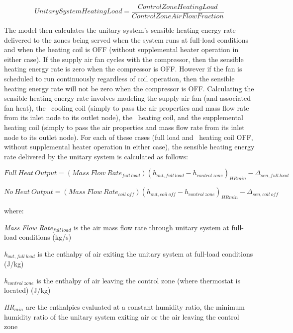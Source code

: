 \begin{equation}
UnitarySystemHeatingLoad = \frac{{ControlZoneHeatingLoad}}{{ControlZoneAirFlowFraction}}
\label{eq:UnitarySystemHeatingLoad}
\end{equation}

The model then calculates the unitary system's sensible heating energy rate delivered to the zones being served when the system runs at full-load conditions and when the heating coil is OFF (without supplemental heater operation in either case). If the supply air fan cycles with the compressor, then the sensible heating energy rate is zero when the compressor is OFF. However if the fan is scheduled to run continuously regardless of coil operation, then the sensible heating energy rate will not be zero when the compressor is OFF. Calculating the sensible heating energy rate involves modeling the supply air fan (and associated fan heat), the~ cooling coil (simply to pass the air properties and mass flow rate from its inlet node to its outlet node), the~ heating coil, and the supplemental heating coil (simply to pass the air properties and mass flow rate from its inlet node to its outlet node). For each of these cases (full load and~ heating coil OFF, without supplemental heater operation in either case), the sensible heating energy rate delivered by the unitary system is calculated as follows:

\begin{equation}
Full~Heat~Output = (Mass~Flow~Rat{e_{full~load}}){({h_{out,full~load}} - {h_{control~zone}})_{HRmin}} - {\Delta_{sen,full~load}}
\end{equation}

\begin{equation}
No~Heat~Output = (Mass~Flow~Rat{e_{coil~off}}){({h_{out,coil~off}} - {h_{control~zone}})_{HRmin}} - {\Delta_{sen,coil~off}}
\end{equation}

where:

\emph{Mass Flow Rate\(_{full~load}\)} is the air mass flow rate through unitary system at full-load conditions (kg/s)

\emph{h\(_{out, full~load}\)} is the enthalpy of air exiting the unitary system at full-load conditions (J/kg)

\emph{h\(_{control~zone}\)} is the enthalpy of air leaving the control zone (where thermostat is located) (J/kg)

\emph{HR\(_{min}\)} are the enthalpies evaluated at a constant humidity ratio, the minimum humidity ratio of the unitary system exiting air or the air leaving the control zone

